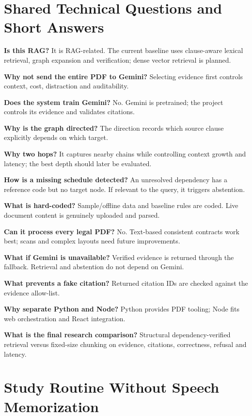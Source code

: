\documentclass[11pt,letterpaper]{article}
\begin{document}
\section{Shared Technical Questions and Short Answers}
\textbf{Is this RAG?} It is RAG-related. The current baseline uses clause-aware lexical retrieval, graph expansion and verification; dense vector retrieval is planned.\par
\textbf{Why not send the entire PDF to Gemini?} Selecting evidence first controls context, cost, distraction and auditability.\par
\textbf{Does the system train Gemini?} No. Gemini is pretrained; the project controls its evidence and validates citations.\par
\textbf{Why is the graph directed?} The direction records which source clause explicitly depends on which target.\par
\textbf{Why two hops?} It captures nearby chains while controlling context growth and latency; the best depth should later be evaluated.\par
\textbf{How is a missing schedule detected?} An unresolved dependency has a reference code but no target node. If relevant to the query, it triggers abstention.\par
\textbf{What is hard-coded?} Sample/offline data and baseline rules are coded. Live document content is genuinely uploaded and parsed.\par
\textbf{Can it process every legal PDF?} No. Text-based consistent contracts work best; scans and complex layouts need future improvements.\par
\textbf{What if Gemini is unavailable?} Verified evidence is returned through the fallback. Retrieval and abstention do not depend on Gemini.\par
\textbf{What prevents a fake citation?} Returned citation IDs are checked against the evidence allow-list.\par
\textbf{Why separate Python and Node?} Python provides PDF tooling; Node fits web orchestration and React integration.\par
\textbf{What is the final research comparison?} Structural dependency-verified retrieval versus fixed-size chunking on evidence, citations, correctness, refusal and latency.\par

\section{Study Routine Without Speech Memorization}
\end{document}
